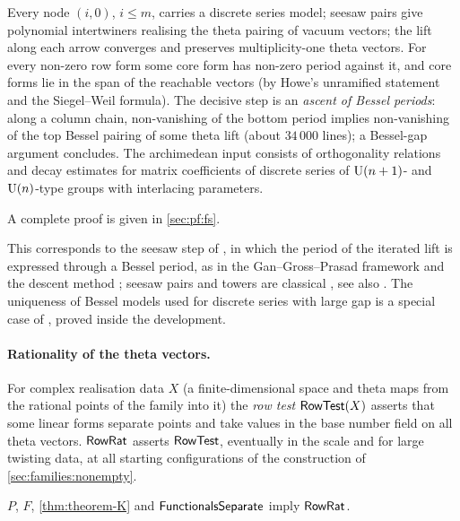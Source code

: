 \begin{proofoutline}
Every node $(i,0)$, $i\le m$, carries a discrete series model; seesaw pairs give polynomial intertwiners
realising the theta pairing of vacuum vectors; the lift along each arrow converges and preserves
multiplicity-one theta vectors. For every non-zero row form some core form has non-zero period against it, and
core forms lie in the span of the reachable vectors (by Howe's unramified statement and the Siegel--Weil formula).
The decisive step is an \emph{ascent of Bessel periods}: along a column chain, non-vanishing of the bottom period
implies non-vanishing of the top Bessel pairing of some theta lift (about $34\,000$ lines); a Bessel-gap argument
concludes. The archimedean input consists of orthogonality relations and decay estimates for matrix coefficients
of discrete series of $\operatorname{U}(n+1)$- and $\operatorname{U}(n)$-type groups with interlacing parameters.

A complete proof is given in \cref{sec:pf:fs}.
\end{proofoutline}

\begin{remark}\label{rem:families:seesaw}
This corresponds to the seesaw step of \cite{Announcement2026}, in which the period of the iterated lift is
expressed through a Bessel period, as in the Gan--Gross--Prasad framework and the descent method
\cite{GanGrossPrasad2012,GinzburgRallisSoudry2011}; seesaw pairs and towers are classical
\cite{Kudla1994,HarrisKudlaSweet1996}, see also \cite{Li1992}. The uniqueness of Bessel models used for discrete
series with large gap is a special case of \cite{JiangSunZhu2010,SunZhu2012}, proved inside the development.
\end{remark}

\paragraph{Rationality of the theta vectors.}
For complex realisation data $X$ (a finite-dimensional space and theta maps from the rational points of the
family into it) the \emph{row test} $\mathsf{RowTest}(X)$ asserts that some linear forms separate points and
take values in the base number field on all theta vectors. $\mathsf{RowRat}$ asserts $\mathsf{RowTest}$,
eventually in the scale and for large twisting data, at all starting configurations of the construction of
\cref{sec:families:nonempty}.

\begin{proposition}\Fmark\label{prop:families:rowrat}
$P$, $F$, \cref{thm:theorem-K} and $\mathsf{FunctionalsSeparate}$ imply $\mathsf{RowRat}$.
\end{proposition}

